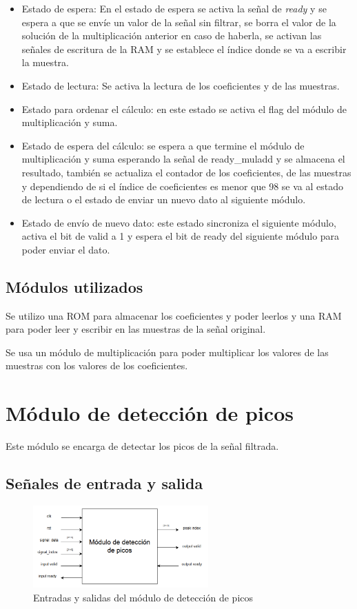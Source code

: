\begin{itemize}
    \item Estado de espera: En el estado de espera se activa la señal de \textit{ready} y se espera a que se envíe un valor de la
    señal sin filtrar, se borra el valor de la solución de la multiplicación anterior en caso de haberla, se activan las
    señales de escritura de la RAM y se establece el índice donde se va a escribir la muestra.
    \item Estado de lectura: Se activa la lectura de los coeficientes y de las muestras.
    \item Estado para ordenar el cálculo: en este estado se activa el flag del módulo de multiplicación y suma.
    \item Estado de espera del cálculo: se espera a que termine el módulo de multiplicación y suma esperando la señal de ready\_muladd
    y se almacena el resultado, también se actualiza el contador de los coeficientes, de las muestras y dependiendo de si el 
    índice de coeficientes es menor que 98 se va al estado de lectura o el estado de enviar un nuevo dato al siguiente módulo.
    \item Estado de envío de nuevo dato: este estado sincroniza el siguiente módulo, activa el bit de valid a 1 y espera el bit
    de ready del siguiente módulo para poder enviar el dato.
\end{itemize}

\subsection{Módulos utilizados}
Se utilizo una ROM para almacenar los coeficientes y poder leerlos y una RAM 
para poder leer y escribir en las muestras de la señal original.

Se usa un módulo de multiplicación para poder multiplicar los valores de las muestras con los valores de los coeficientes.

\section{Módulo de detección de picos}

Este módulo se encarga de detectar los picos de la señal filtrada. 
\subsection{Señales de entrada y salida}

    \begin{figure}[h!]
        \centering
        \includegraphics[width=0.6\textwidth]{./Images/img_implementacion_hw/diagramamodulodeteccionpicos.png}
        \caption{Entradas y salidas del módulo de detección de picos}
        \label{fig:moddeteccionpicos}
    \end{figure} 
    
